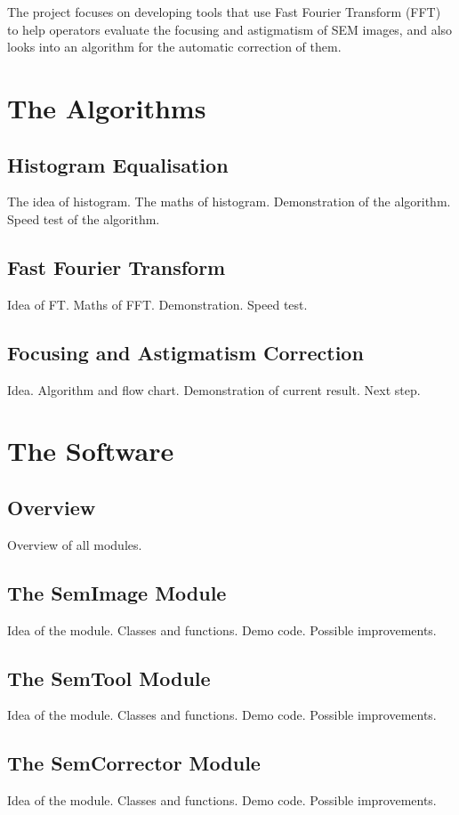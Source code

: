 \documentclass{article}
\begin{document}
The project focuses on developing tools that use Fast Fourier Transform (FFT) to help operators evaluate the focusing and astigmatism of SEM images, and also looks into an algorithm for the automatic correction of them.

\section{The Algorithms}
\subsection{Histogram Equalisation}
The idea of histogram.
The maths of histogram.
Demonstration of the algorithm.
Speed test of the algorithm.

\subsection{Fast Fourier Transform} 
Idea of FT.
Maths of FFT.
Demonstration.
Speed test. 

\subsection{Focusing and Astigmatism Correction}
Idea.
Algorithm and flow chart.
Demonstration of current result.
Next step.

\section{The Software}
\subsection{Overview}
Overview of all modules.

\subsection{The SemImage Module}
Idea of the module.
Classes and functions.
Demo code.
Possible improvements.

\subsection{The SemTool Module}
Idea of the module.
Classes and functions.
Demo code.
Possible improvements.

\subsection{The SemCorrector Module}
Idea of the module.
Classes and functions.
Demo code.
Possible improvements.
\end{document}
